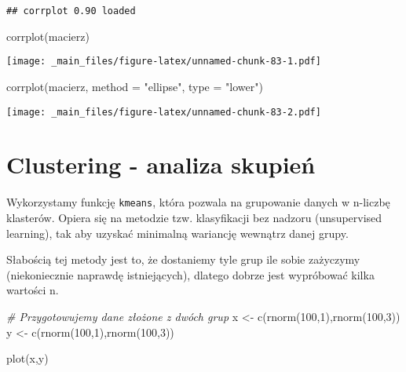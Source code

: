 \documentclass[
]{book}
\newenvironment{Shaded}{\begin{snugshade}}{\end{snugshade}}
\newcommand{\AttributeTok}[1]{\textcolor[rgb]{0.77,0.63,0.00}{#1}}
\newcommand{\CommentTok}[1]{\textcolor[rgb]{0.56,0.35,0.01}{\textit{#1}}}
\newcommand{\DecValTok}[1]{\textcolor[rgb]{0.00,0.00,0.81}{#1}}
\newcommand{\FunctionTok}[1]{\textcolor[rgb]{0.00,0.00,0.00}{#1}}
\newcommand{\NormalTok}[1]{#1}
\newcommand{\OtherTok}[1]{\textcolor[rgb]{0.56,0.35,0.01}{#1}}
\newcommand{\StringTok}[1]{\textcolor[rgb]{0.31,0.60,0.02}{#1}}
\begin{document}
\begin{verbatim}
## corrplot 0.90 loaded
\end{verbatim}

\begin{Shaded}
\begin{Highlighting}[]
\FunctionTok{corrplot}\NormalTok{(macierz)}
\end{Highlighting}
\end{Shaded}

\texttt{[image: \_main\_files/figure-latex/unnamed-chunk-83-1.pdf]}

\begin{Shaded}
\begin{Highlighting}[]
\FunctionTok{corrplot}\NormalTok{(macierz, }\AttributeTok{method =} \StringTok{"ellipse"}\NormalTok{, }\AttributeTok{type =} \StringTok{"lower"}\NormalTok{)}
\end{Highlighting}
\end{Shaded}

\texttt{[image: \_main\_files/figure-latex/unnamed-chunk-83-2.pdf]}

\hypertarget{clustering---analiza-skupieux144}{%
\section{Clustering - analiza skupień}\label{clustering---analiza-skupieux144}}

Wykorzystamy funkcję \texttt{kmeans}, która pozwala na grupowanie danych w n-liczbę klasterów. Opiera się na metodzie tzw. klasyfikacji bez nadzoru (unsupervised learning), tak aby uzyskać minimalną wariancję wewnątrz danej grupy.

Słabością tej metody jest to, że dostaniemy tyle grup ile sobie zażyczymy (niekoniecznie naprawdę istniejących), dlatego dobrze jest wypróbować kilka wartości n.

\begin{Shaded}
\begin{Highlighting}[]
\CommentTok{\# Przygotowujemy dane złożone z dwóch grup}
\NormalTok{x }\OtherTok{\textless{}{-}} \FunctionTok{c}\NormalTok{(}\FunctionTok{rnorm}\NormalTok{(}\DecValTok{100}\NormalTok{,}\DecValTok{1}\NormalTok{),}\FunctionTok{rnorm}\NormalTok{(}\DecValTok{100}\NormalTok{,}\DecValTok{3}\NormalTok{))}
\NormalTok{y }\OtherTok{\textless{}{-}} \FunctionTok{c}\NormalTok{(}\FunctionTok{rnorm}\NormalTok{(}\DecValTok{100}\NormalTok{,}\DecValTok{1}\NormalTok{),}\FunctionTok{rnorm}\NormalTok{(}\DecValTok{100}\NormalTok{,}\DecValTok{3}\NormalTok{))}

\FunctionTok{plot}\NormalTok{(x,y)}
\end{Highlighting}
\end{Shaded}
\end{document}
